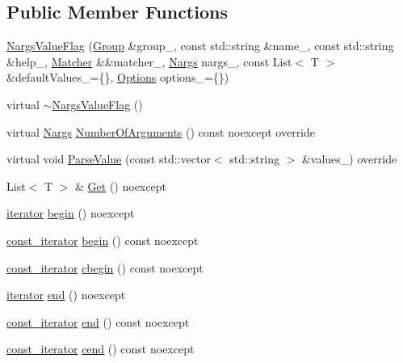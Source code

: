 \subsection*{Public Member Functions}
\begin{DoxyCompactItemize}
\item 
\hyperlink{classargs_1_1_nargs_value_flag_a49370dd6481756ac2a2177af0068b4bf}{Nargs\+Value\+Flag} (\hyperlink{classargs_1_1_group}{Group} \&group\+\_\+, const std\+::string \&name\+\_\+, const std\+::string \&help\+\_\+, \hyperlink{classargs_1_1_matcher}{Matcher} \&\&matcher\+\_\+, \hyperlink{structargs_1_1_nargs}{Nargs} nargs\+\_\+, const List$<$ T $>$ \&default\+Values\+\_\+=\{\}, \hyperlink{namespaceargs_aa530c0f95194aa275f49a5f299ac9e77}{Options} options\+\_\+=\{\})
\item 
virtual \hyperlink{classargs_1_1_nargs_value_flag_af646d06281e7cb6d453cf36533639601}{$\sim$\+Nargs\+Value\+Flag} ()
\item 
virtual \hyperlink{structargs_1_1_nargs}{Nargs} \hyperlink{classargs_1_1_nargs_value_flag_a8db7ce6ec0d27f649dbfb1bba908078a}{Number\+Of\+Arguments} () const noexcept override
\item 
virtual void \hyperlink{classargs_1_1_nargs_value_flag_aa1ef4abaec468d69c89c02dd8bfdbf38}{Parse\+Value} (const std\+::vector$<$ std\+::string $>$ \&values\+\_\+) override
\item 
List$<$ T $>$ \& \hyperlink{classargs_1_1_nargs_value_flag_ad9789e398db1944fc641153c8742e2c6}{Get} () noexcept
\item 
\hyperlink{classargs_1_1_nargs_value_flag_aeaf17e645a109333204dcb7c954a2473}{iterator} \hyperlink{classargs_1_1_nargs_value_flag_af41b80e20350b97458e4584136311508}{begin} () noexcept
\item 
\hyperlink{classargs_1_1_nargs_value_flag_a115760faf263d007148b30c99d8e6bdc}{const\+\_\+iterator} \hyperlink{classargs_1_1_nargs_value_flag_a72e0031c35bacf86616f1516a1be6fa4}{begin} () const noexcept
\item 
\hyperlink{classargs_1_1_nargs_value_flag_a115760faf263d007148b30c99d8e6bdc}{const\+\_\+iterator} \hyperlink{classargs_1_1_nargs_value_flag_a18231a60382d2992a3fe76686557512f}{cbegin} () const noexcept
\item 
\hyperlink{classargs_1_1_nargs_value_flag_aeaf17e645a109333204dcb7c954a2473}{iterator} \hyperlink{classargs_1_1_nargs_value_flag_afd4a39d8f62aec0daa30674548a30243}{end} () noexcept
\item 
\hyperlink{classargs_1_1_nargs_value_flag_a115760faf263d007148b30c99d8e6bdc}{const\+\_\+iterator} \hyperlink{classargs_1_1_nargs_value_flag_acf5a2440b856c875834abbaf88b8782f}{end} () const noexcept
\item 
\hyperlink{classargs_1_1_nargs_value_flag_a115760faf263d007148b30c99d8e6bdc}{const\+\_\+iterator} \hyperlink{classargs_1_1_nargs_value_flag_a835ee8e007c726d032318c24ac02c0c6}{cend} () const noexcept
\end{DoxyCompactItemize}
